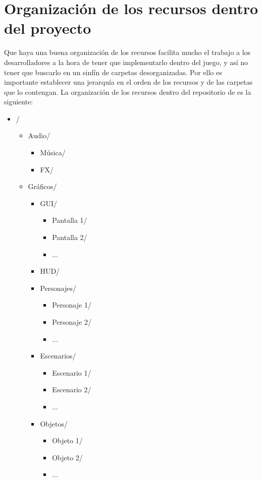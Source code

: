  \section{Organización de los recursos dentro del proyecto}
    Que haya una buena organización de los recursos facilita mucho el trabajo a los desarrolladores a la hora de tener que implementarlo dentro del juego, y así no tener que buscarlo en un sinfín de carpetas desorganizadas. Por ello es importante establecer una jerarquía en el orden de los recursos y de las carpetas que lo contengan. La organización de los recursos dentro del repositorio de \nombrejuego es la siguiente:
    
    
    \begin{itemize}
    \item {}/
        \begin{itemize}
        \item Audio/
            \begin{itemize}
            \item Música/
            \item FX/
            \end{itemize}
        \item Gráficos/
            \begin{itemize}
            \item GUI/
                \begin{itemize}
                \item Pantalla 1/
                \item Pantalla 2/
                \item ...
                \end{itemize}
            \item HUD/
            \item Personajes/
                \begin{itemize}
                \item Personaje 1/
                \item Personaje 2/
                \item ...
                \end{itemize}
            \item Escenarios/
                \begin{itemize}
                \item Escenario 1/
                \item Escenario 2/
                \item ...
                \end{itemize}
            \item Objetos/
                \begin{itemize}
                \item Objeto 1/
                \item Objeto 2/
                \item ...
                \end{itemize}
            \end{itemize}
        \end{itemize}
    \end{itemize}
    
